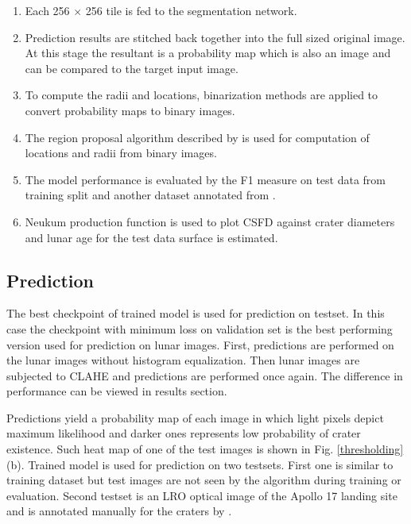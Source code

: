 \documentclass[11pt]{article}
\begin{document}
\begin{enumerate}
	\item Each 256 $\times$ 256 tile is fed to the segmentation network.
	\item Prediction results are stitched back together into the full sized original image. At this stage the resultant is a probability map which is also an image and can be compared to the target input image.
	\item To compute the radii and locations, binarization methods are applied to convert probability maps to binary images.
	\item The region proposal algorithm described by \cite{reiss1993recognizing} is used for computation of locations and radii from binary images.
	\item The model performance is evaluated by the F1 measure on test data from training split and another dataset annotated from \cite{dino2020}.
	\item Neukum production function is used to plot CSFD against crater diameters and lunar age for the test data surface is estimated.
\end{enumerate}

\subsection{Prediction}
The best checkpoint of trained model is used for prediction on testset. In this case the checkpoint with minimum loss on validation set is the best performing version used for prediction on lunar images. First, predictions are performed on the lunar images without histogram equalization. Then lunar images are subjected to CLAHE and predictions are performed once again. The difference in performance can be viewed in results section.

Predictions yield a probability map of each image in which light pixels depict maximum likelihood and darker ones represents low probability of crater existence. Such heat map of one of the test images is shown in Fig. \ref{thresholding} (b). Trained model is used for prediction on two testsets. First one is similar to training dataset but test images are not seen by the algorithm during training or evaluation. Second testset is an LRO optical image of the Apollo 17 landing site and is annotated manually for the craters by \cite{dino2020}.
\end{document}
